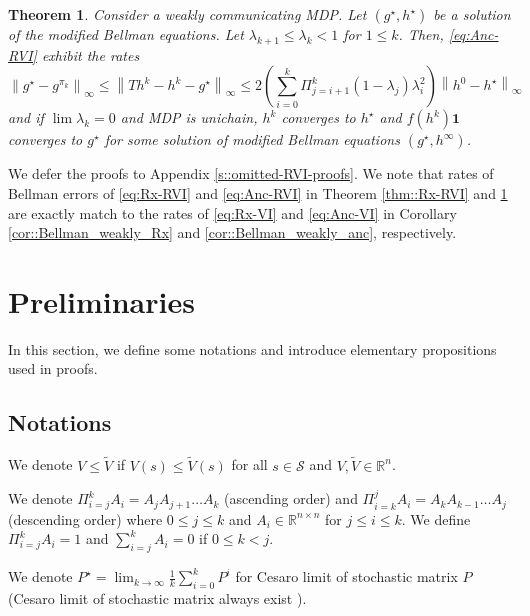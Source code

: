 \documentclass{article} %
\newcommand{\cS}{\mathcal{S}}
\newcommand{\real}{\mathbb{R}}
\newcommand*{\para}[1]{\left({#1}\right)}
\newcommand*{\infn}[1]{\left\|{#1}\right\|_{\infty}}
\newtheorem{theorem}{Theorem}
\begin{document}
\begin{theorem}\label{thm::Anc-RVI}
    Consider a weakly communicating MDP. Let $(g^{\star},h^{\star})$ be a solution of the modified Bellman equations. Let $\lambda_{k+1} \le \lambda_{k} <1$ for $1 \le k$. Then, \ref{eq:Anc-RVI} exhibit the rates 
   \[ \infn{g^{\star}-g^{\pi_k}} \le \infn{Th^k-h^k-g^{\star}} \le 2\para{\sum^k_{i=0} \Pi^k_{j=i+1}(1-\lambda_j) \lambda^2_i }\infn{h^0-h^{\star}}\]
   and if $\lim \lambda_k = 0$ and MDP is unichain, $h^k$ converges to $h^{\star}$ and $f(h^k)\mathbf{1}$ converges to $g^{\star}$ for some solution of modified Bellman equations  $(g^{\star}, h^\infty)$.
\end{theorem}
We defer the proofs to Appendix \ref{s::omitted-RVI-proofs}. We note that rates of Bellman errors of \ref{eq:Rx-RVI} and \ref{eq:Anc-RVI} in Theorem \ref{thm::Rx-RVI} and \ref{thm::Anc-RVI} are exactly match to the rates of \ref{eq:Rx-VI} and \ref{eq:Anc-VI} in Corollary \ref{cor::Bellman_weakly_Rx} and \ref{cor::Bellman_weakly_anc}, respectively.

\vspace{0.1in}

\section{Preliminaries}
    
In this section, we define some notations and introduce elementary propositions used in proofs. 


\subsection{Notations}
We denote $V \le \tilde{V}$ if $V(s)\le \tilde{V}(s)$ for all $s \in \cS$ and $V, \tilde{V} \in \real^n$. 

We denote $\Pi^k_{i=j}A_i =A_jA_{j+1}\dots A_k$ (ascending order) and $\Pi^j_{i=k}A_i =A_kA_{k-1}\dots A_j$ (descending order) where $ 0 \le j \le k $ and $A_i \in \real^{n\times n}$ for $j \le i \le k$. We define $\Pi^{k}_{i=j}A_i=1$ and $\sum^{k}_{i=j}A_i=0$ if $ 0 \le k < j$.      

We denote $P^{\star}= 
\lim_{k\rightarrow \infty}\frac{1}{k} \sum^k_{i=0}P^i$ for Cesaro limit of stochastic matrix $P$ (Cesaro limit of stochastic matrix always exist \citep[Theorem A.6]{10.5555/528623}).
\end{document}
